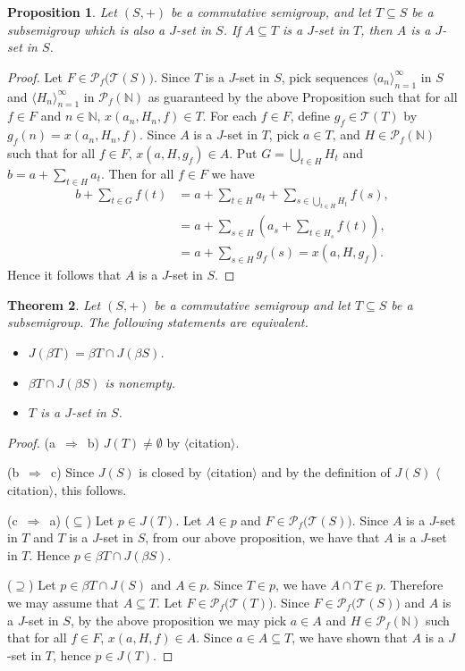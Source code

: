 \documentclass[12pt]{article}
\theoremstyle{plain}
\newtheorem{thm}{Theorem}[section]
\newtheorem{prop}[thm]{Proposition}
\theoremstyle{definition}
\newcommand{\la}{\langle}
\newcommand{\ra}{\rangle}
\newcommand{\bbN}{\mathbb{N}}
\newcommand{\calT}{\mathcal{T}}
\newcommand{\Pf}{\mathcal{P}_f}
\begin{document}
\begin{prop}
  Let $(S, +)$ be a commutative semigroup, and let $T \subseteq S$
  be a subsemigroup which is also a $J$-set in $S$. 
  If $A \subseteq T$ is a $J$-set in $T$, then $A$ is a $J$-set in $S$.
\end{prop}
\begin{proof}
  Let $F \in \Pf\bigl(\calT(S)\bigr)$.
  Since $T$ is a $J$-set in $S$, pick sequences $\la a_n
  \ra_{n=1}^\infty$ in $S$ and $\la H_n \ra_{n=1}^\infty$ in
  $\Pf(\bbN)$ as guaranteed by the above Proposition such that for
  all $f \in F$ and $n \in \bbN$, $x(a_n, H_n, f) \in T$.
  For each $f \in F$, define $g_f \in \calT(T)$ by $g_f(n) = x(a_n,
  H_n, f)$. 
  Since $A$ is a $J$-set in $T$, pick $a \in T$, and $H \in
  \Pf(\bbN)$ such that for all $f \in F$, $x(a, H, g_f) \in A$. 
  Put $G = \bigcup_{t \in H} H_t$ and $b = a + \sum_{t \in H} a_t$. 
  Then for all $f \in F$ we have
  \begin{align*}
    b + \sum_{t \in G} f(t) &= a + \sum_{t \in H} a_t + \sum_{s \in
      \bigcup_{t \in H} H_t} f(s), \\
    &= a + \sum_{s \in H}(a_s + \sum_{t \in H_s} f(t)), \\
    &= a + \sum_{s \in H} g_f(s) = x(a, H, g_f).
  \end{align*}
  Hence it follows that $A$ is a $J$-set in $S$. 
\end{proof}

\begin{thm}
  Let $(S, +)$ be a commutative semigroup and let $T \subseteq S$ be a
  subsemigroup.
  The following statements are equivalent. 
  \begin{itemize}
    \item[(a)] $J(\beta T) = \beta T \cap J(\beta S)$.
    \item[(b)] $\beta T \cap J(\beta S)$ is nonempty.
    \item[(c)] $T$ is a $J$-set in $S$.
  \end{itemize}
\end{thm}
\begin{proof}
  (\mbox{a $\Rightarrow$ b})
  $J(T) \ne \emptyset$ by \mbox{$\la$citation$\ra$}.

  (\mbox{b $\Rightarrow$ c})
  Since $J(S)$ is closed by \mbox{$\la$citation$\ra$} and by the
  definition of $J(S)$ \mbox{$\la$citation$\ra$}, this follows.

  (\mbox{c $\Rightarrow$ a})
  ($\subseteq$) 
  Let $p \in J(T)$.
  Let $A \in p$ and $F \in \Pf\bigl(\calT(S)\bigr)$.
  Since $A$ is a $J$-set in $T$ and $T$ is a $J$-set in $S$, from our
  above proposition, we have that $A$ is a $J$-set in $T$. 
  Hence $p \in \beta T \cap J(\beta S)$.

  ($\supseteq$)
  Let $p \in \beta T \cap J(S)$ and $A \in p$. 
  Since $T \in p$, we have $A \cap T \in p$.
  Therefore we may assume that $A \subseteq T$.
  Let $F \in \Pf\bigl(\calT(T)\bigr)$.
  Since $F \in \Pf\bigl(\calT(S)\bigr)$ and $A$ is a $J$-set in $S$,
  by the above proposition we may pick $a \in A$ and $H \in \Pf(\bbN)$
  such that for all $f \in F$, $x(a, H, f) \in A$. 
  Since $a \in A \subseteq T$, we have shown that $A$ is a $J$-set in
  $T$, hence $p \in J(T)$. 
\end{proof}
\end{document}
